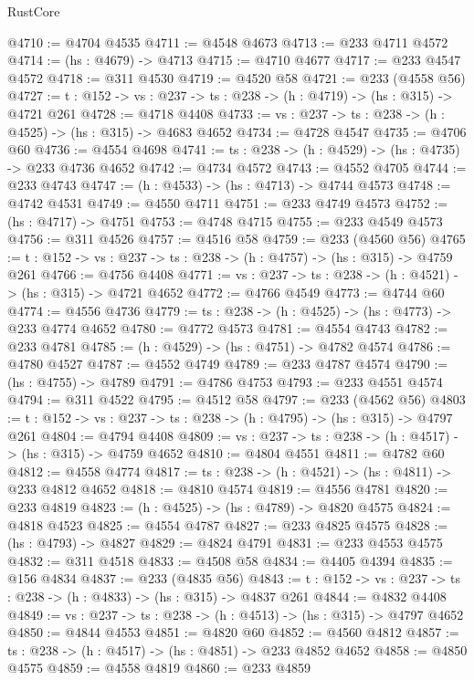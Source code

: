 \begin{lexlean}{RustCore}
\begin{coremodule}
@4710 := @4704 @4535
@4711 := @4548 @4673
@4713 := @233 @4711 @4572
@4714 := (hs : @4679) -> @4713
@4715 := @4710 @4677
@4717 := @233 @4547 @4572
@4718 := @311 @4530
@4719 := @4520 @58
@4721 := @233 (@4558 @56)
@4727 := {t : @152} -> {vs : @237} -> {ts : @238} -> (h : @4719) -> (hs : @315) -> @4721 @261
@4728 := @4718 @4408
@4733 := {vs : @237} -> {ts : @238} -> (h : @4525) -> (hs : @315) -> @4683 @4652
@4734 := @4728 @4547
@4735 := @4706 @60
@4736 := @4554 @4698
@4741 := {ts : @238} -> (h : @4529) -> (hs : @4735) -> @233 @4736 @4652
@4742 := @4734 @4572
@4743 := @4552 @4705
@4744 := @233 @4743
@4747 := (h : @4533) -> (hs : @4713) -> @4744 @4573
@4748 := @4742 @4531
@4749 := @4550 @4711
@4751 := @233 @4749 @4573
@4752 := (hs : @4717) -> @4751
@4753 := @4748 @4715
@4755 := @233 @4549 @4573
@4756 := @311 @4526
@4757 := @4516 @58
@4759 := @233 (@4560 @56)
@4765 := {t : @152} -> {vs : @237} -> {ts : @238} -> (h : @4757) -> (hs : @315) -> @4759 @261
@4766 := @4756 @4408
@4771 := {vs : @237} -> {ts : @238} -> (h : @4521) -> (hs : @315) -> @4721 @4652
@4772 := @4766 @4549
@4773 := @4744 @60
@4774 := @4556 @4736
@4779 := {ts : @238} -> (h : @4525) -> (hs : @4773) -> @233 @4774 @4652
@4780 := @4772 @4573
@4781 := @4554 @4743
@4782 := @233 @4781
@4785 := (h : @4529) -> (hs : @4751) -> @4782 @4574
@4786 := @4780 @4527
@4787 := @4552 @4749
@4789 := @233 @4787 @4574
@4790 := (hs : @4755) -> @4789
@4791 := @4786 @4753
@4793 := @233 @4551 @4574
@4794 := @311 @4522
@4795 := @4512 @58
@4797 := @233 (@4562 @56)
@4803 := {t : @152} -> {vs : @237} -> {ts : @238} -> (h : @4795) -> (hs : @315) -> @4797 @261
@4804 := @4794 @4408
@4809 := {vs : @237} -> {ts : @238} -> (h : @4517) -> (hs : @315) -> @4759 @4652
@4810 := @4804 @4551
@4811 := @4782 @60
@4812 := @4558 @4774
@4817 := {ts : @238} -> (h : @4521) -> (hs : @4811) -> @233 @4812 @4652
@4818 := @4810 @4574
@4819 := @4556 @4781
@4820 := @233 @4819
@4823 := (h : @4525) -> (hs : @4789) -> @4820 @4575
@4824 := @4818 @4523
@4825 := @4554 @4787
@4827 := @233 @4825 @4575
@4828 := (hs : @4793) -> @4827
@4829 := @4824 @4791
@4831 := @233 @4553 @4575
@4832 := @311 @4518
@4833 := @4508 @58
@4834 := @4405 @4394
@4835 := @156 @4834
@4837 := @233 (@4835 @56)
@4843 := {t : @152} -> {vs : @237} -> {ts : @238} -> (h : @4833) -> (hs : @315) -> @4837 @261
@4844 := @4832 @4408
@4849 := {vs : @237} -> {ts : @238} -> (h : @4513) -> (hs : @315) -> @4797 @4652
@4850 := @4844 @4553
@4851 := @4820 @60
@4852 := @4560 @4812
@4857 := {ts : @238} -> (h : @4517) -> (hs : @4851) -> @233 @4852 @4652
@4858 := @4850 @4575
@4859 := @4558 @4819
@4860 := @233 @4859

\end{coremodule}
\end{lexlean}
